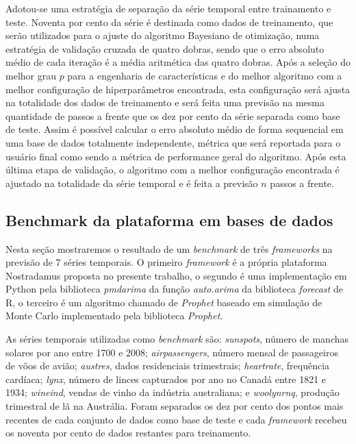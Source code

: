 \documentclass[twocolumn]{rbef}
\newcommand{\1}{\mathbbm{1}}
\begin{document}
Adotou-se uma estratégia de separação da série temporal entre trainamento e teste. Noventa por cento da série é destinada como dados de treinamento, que serão utilizados para o ajuste do algoritmo Bayesiano de otimização, numa estratégia de validação cruzada de quatro dobras, sendo que o erro absoluto médio de cada iteração é a média aritmética das quatro dobras. Após a seleção do melhor grau $p$ para a engenharia de características e do melhor algoritmo com a melhor configuração de hiperparâmetros encontrada, esta configuração será ajusta na totalidade dos dados de treinamento e será feita uma previsão na mesma quantidade de passos a frente que os dez por cento da série separada como base de teste. Assim é possível calcular o erro absoluto médio de forma sequencial em uma base de dados totalmente independente, métrica que será reportada para o usuário final como sendo a métrica de performance geral do algoritmo. Após esta última etapa de validação, o algoritmo com a melhor configuração encontrada é ajustado na totalidade da série temporal e é feita a previsão $n$ passos a frente.

\subsection{Benchmark da plataforma em bases de dados} \label{benchmark}

Nesta seção mostraremos o resultado de um \textit{benchmark} de três \textit{frameworks} na previsão de 7 séries temporais. O primeiro \textit{framework} é a própria plataforma Nostradamus proposta no presente trabalho, o segundo é uma implementação em Python pela biblioteca \textit{pmdarima} da função \textit{auto.arima} da biblioteca \textit{forecast} de R, o terceiro é um algoritmo chamado de \textit{Prophet} baseado em simulação de Monte Carlo implementado pela biblioteca \textit{Prophet}.

As séries temporais utilizadas como \textit{benchmark} são: \textit{sunspots}, número de manchas solares por ano entre 1700 e 2008; \textit{airpassengers}, número mensal de passageiros de vôos de avião; \textit{austres}, dados residenciais trimestrais; \textit{heartrate}, frequência cardíaca; \textit{lynx}, número de linces capturados por ano no Canadá entre 1821 e 1934; \textit{wineind}, vendas de vinho da indústria australiana; e \textit{woolynrnq}, produção trimestral de lã na Austrália. Foram separados os dez por cento dos pontos mais recentes de cada conjunto de dados como base de teste e cada \textit{framework} recebeu os noventa por cento de dados restantes para treinamento.
\end{document}

